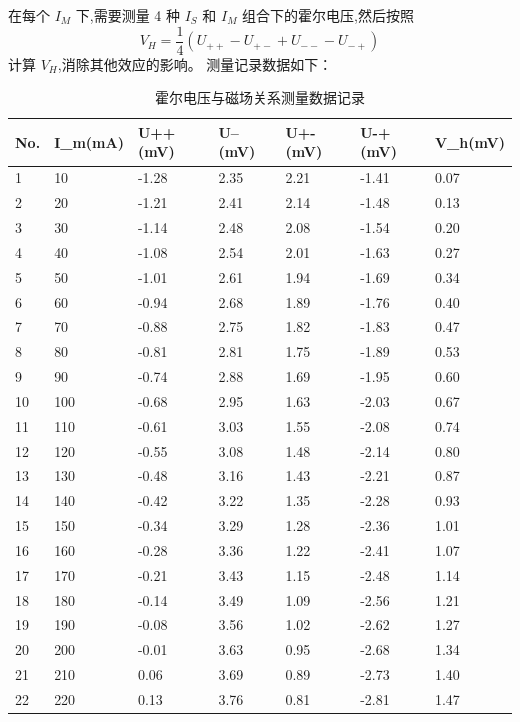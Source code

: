 \documentclass[UTF8]{ctexart}
\begin{document}
    在每个 $I_M$ 下,需要测量 4 种 $I_S$ 和 $I_M$ 组合下的霍尔电压,然后按照
    \begin{equation}
    V_H = \frac{1}{4}(U_{++} - U_{+-} + U_{--} - U_{-+})
    \end{equation} 
    计算 $V_H$,消除其他效应的影响。
    测量记录数据如下：

    \begin{table}[htbp]
        \centering
        \caption{霍尔电压与磁场关系测量数据记录}
        \begin{tabular}{l|llllll}
            No.&I\_m(mA)&U++(mV)&U--(mV)&U+-(mV)&U-+(mV)&V\_h(mV)\\
            \hline
            1&10&-1.28&2.35&2.21&-1.41&0.07\\
            2&20&-1.21&2.41&2.14&-1.48&0.13\\
            3&30&-1.14&2.48&2.08&-1.54&0.20\\
            4&40&-1.08&2.54&2.01&-1.63&0.27\\
            5&50&-1.01&2.61&1.94&-1.69&0.34\\
            6&60&-0.94&2.68&1.89&-1.76&0.40\\
            7&70&-0.88&2.75&1.82&-1.83&0.47\\
            8&80&-0.81&2.81&1.75&-1.89&0.53\\
            9&90&-0.74&2.88&1.69&-1.95&0.60\\
            10&100&-0.68&2.95&1.63&-2.03&0.67\\
            11&110&-0.61&3.03&1.55&-2.08&0.74\\
            12&120&-0.55&3.08&1.48&-2.14&0.80\\
            13&130&-0.48&3.16&1.43&-2.21&0.87\\
            14&140&-0.42&3.22&1.35&-2.28&0.93\\
            15&150&-0.34&3.29&1.28&-2.36&1.01\\
            16&160&-0.28&3.36&1.22&-2.41&1.07\\
            17&170&-0.21&3.43&1.15&-2.48&1.14\\
            18&180&-0.14&3.49&1.09&-2.56&1.21\\
            19&190&-0.08&3.56&1.02&-2.62&1.27\\
            20&200&-0.01&3.63&0.95&-2.68&1.34\\
            21&210&0.06&3.69&0.89&-2.73&1.40\\
            22&220&0.13&3.76&0.81&-2.81&1.47\\

\end{tabular}
\end{table}
\end{document}

